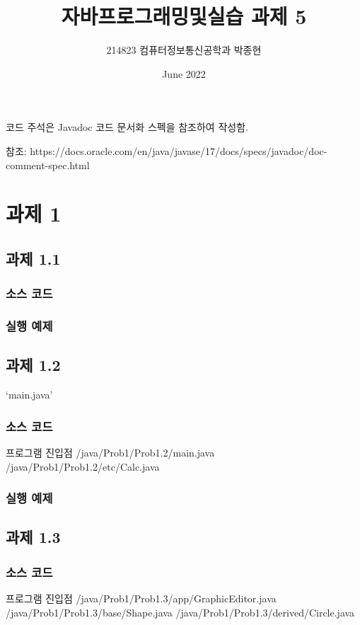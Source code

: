 \documentclass{article}
\title{자바프로그래밍및실습 과제 5}
\author{214823 컴퓨터정보통신공학과 박종현}
\date{June 2022}
\theoremstyle{nonumberplain}
\begin{document}
\maketitle
\pagebreak


코드 주석은 Javadoc 코드 문서화 스펙을 참조하여 작성함.

참조: https://docs.oracle.com/en/java/javase/17/docs/specs/javadoc/doc-comment-spec.html


\section{과제 1}

\subsection{과제 1.1}
\subsubsection{소스 코드}
\subsubsection{실행 예제}

\subsection{과제 1.2}
`main.java'
\subsubsection{소스 코드}
프로그램 진입점
/java/Prob1/Prob1.2/main.java
/java/Prob1/Prob1.2/etc/Calc.java
\subsubsection{실행 예제}

\subsection{과제 1.3}
\subsubsection{소스 코드}
프로그램 진입점
/java/Prob1/Prob1.3/app/GraphicEditor.java
/java/Prob1/Prob1.3/base/Shape.java
/java/Prob1/Prob1.3/derived/Circle.java
\end{document}
